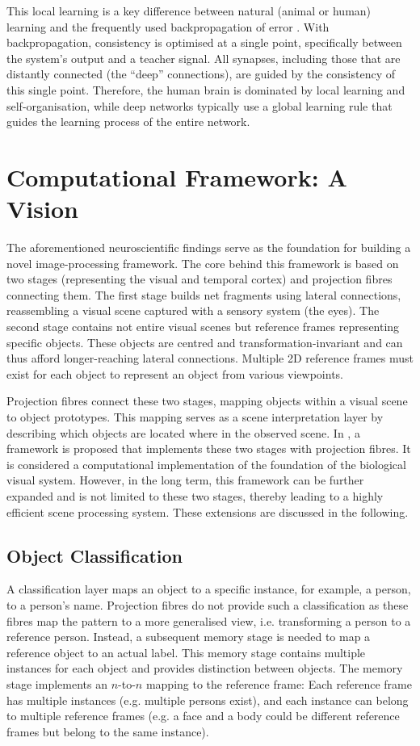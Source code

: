 This local learning is a key difference between natural (animal or human) learning and the frequently used backpropagation of error . With backpropagation, consistency is optimised at a single point, specifically between the system's output and a teacher signal. All synapses, including those that are distantly connected (the ``deep'' connections), are guided by the consistency of this single point. Therefore, the human brain is dominated by local learning and self-organisation, while deep networks typically use a global learning rule that guides the learning process of the entire network.


\section{Computational Framework: A Vision}
The aforementioned neuroscientific findings serve as the foundation for building a novel image-processing framework.
The core behind this framework is based on two stages (representing the visual and temporal cortex) and projection fibres connecting them.
The first stage builds net fragments using lateral connections, reassembling a visual scene captured with a sensory system (the eyes).
The second stage contains not entire visual scenes but reference frames representing specific objects. These objects are centred and transformation-invariant and can thus afford longer-reaching lateral connections.
Multiple 2D reference frames must exist for each object to represent an object from various viewpoints.

Projection fibres connect these two stages, mapping objects within a visual scene to object prototypes.
This mapping serves as a scene interpretation layer by describing which objects are located where in the observed scene.
In , a framework is proposed that implements these two stages with projection fibres.
It is considered a computational implementation of the foundation of the biological visual system.
However, in the long term, this framework can be further expanded and is not limited to these two stages, thereby leading to a highly efficient scene processing system.
These extensions are discussed in the following.

\subsection{Object Classification}
A classification layer maps an object to a specific instance, for example, a person, to a person's name. Projection fibres do not provide such a classification as these fibres map the pattern to a more generalised view, i.e. transforming a person to a reference person. Instead, a subsequent memory stage is needed to map a reference object to an actual label.
This memory stage contains multiple instances for each object and provides distinction between objects. The memory stage implements an $n$-to-$n$ mapping to the reference frame: Each reference frame has multiple instances (e.g. multiple persons exist), and each instance can belong to multiple reference frames (e.g. a face and a body could be different reference frames but belong to the same instance).

